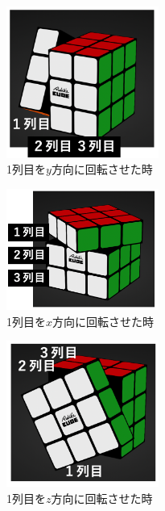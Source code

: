 \documentclass[a4j,titlepage]{jsarticle}
\begin{document}
\begin{figure}[htb]
  \centering
  \includegraphics[width=5cm]{./tex_pic/tate.jpg}
  \caption{1列目を\(y\)方向に回転させた時}
  \label{fig:tate}
\end{figure}
\begin{figure}[htb]
  \centering
  \includegraphics[width=5cm]{./tex_pic/yoko.jpg}
  \caption{1列目を\(x\)方向に回転させた時}
  \label{fig:yoko}
\end{figure}
\begin{figure}[htb]
  \centering
  \includegraphics[width=5cm]{./tex_pic/kai.jpg}
  \caption{1列目を\(z\)方向に回転させた時}
  \label{fig:kai}
\end{figure}
\end{document}
